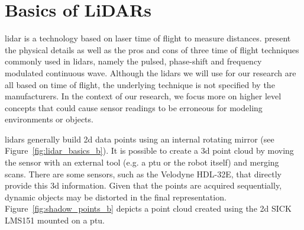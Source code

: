 \section{Basics of LiDARs}
\label{sec:chap_lidar_basics}

\gls*{lidar} is a technology based on laser time of flight to measure distances. \citet{Bosch2001} present the physical details as well as the pros and cons of three time of flight techniques commonly used in \gls*{lidar}s, namely the pulsed, phase-shift and frequency modulated continuous wave. Although the \gls*{lidar}s we will use for our research are all based on time of flight, the underlying technique is not specified by the manufacturers. In the context of our research, we focus more on higher level concepts that could cause sensor readings to be erroneous for modeling environments or objects.

\gls*{lidar}s generally build \gls*{2d} data points using an internal rotating mirror (see Figure~\ref{fig:lidar_basics_b}). It is possible to create a \gls*{3d} point cloud by moving the sensor with an external tool (e.g. a \gls*{ptu} or the robot itself) and merging scans. There are some sensors, such as the Velodyne HDL-32E, that directly provide this \gls*{3d} information. Given that the points are acquired sequentially, dynamic objects may be distorted in the final representation. Figure~\ref{fig:shadow_points_b} depicts a point cloud created using the \gls*{2d} SICK LMS151 mounted on a \gls*{ptu}.

